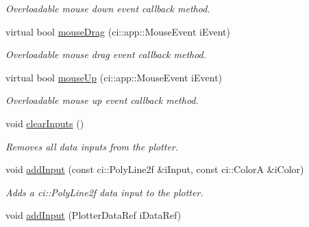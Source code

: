 \begin{DoxyCompactItemize}
\begin{DoxyCompactList}\small\item\em Overloadable mouse down event callback method. \end{DoxyCompactList}\item 
\hypertarget{class_gui_plot_a20d1f7a342435f84ece58f982b93ab73}{virtual bool \hyperlink{class_gui_plot_a20d1f7a342435f84ece58f982b93ab73}{mouse\-Drag} (ci\-::app\-::\-Mouse\-Event i\-Event)}\label{class_gui_plot_a20d1f7a342435f84ece58f982b93ab73}

\begin{DoxyCompactList}\small\item\em Overloadable mouse drag event callback method. \end{DoxyCompactList}\item 
\hypertarget{class_gui_plot_a8f6863d909939793411aa4851bd352b2}{virtual bool \hyperlink{class_gui_plot_a8f6863d909939793411aa4851bd352b2}{mouse\-Up} (ci\-::app\-::\-Mouse\-Event i\-Event)}\label{class_gui_plot_a8f6863d909939793411aa4851bd352b2}

\begin{DoxyCompactList}\small\item\em Overloadable mouse up event callback method. \end{DoxyCompactList}\item 
\hypertarget{class_gui_plot_a3df99256140c63ae43b9ba8faf0d4510}{void \hyperlink{class_gui_plot_a3df99256140c63ae43b9ba8faf0d4510}{clear\-Inputs} ()}\label{class_gui_plot_a3df99256140c63ae43b9ba8faf0d4510}

\begin{DoxyCompactList}\small\item\em Removes all data inputs from the plotter. \end{DoxyCompactList}\item 
\hypertarget{class_gui_plot_a290cf385f061efe1fedec0064f1a00ea}{void \hyperlink{class_gui_plot_a290cf385f061efe1fedec0064f1a00ea}{add\-Input} (const ci\-::\-Poly\-Line2f \&i\-Input, const ci\-::\-Color\-A \&i\-Color)}\label{class_gui_plot_a290cf385f061efe1fedec0064f1a00ea}

\begin{DoxyCompactList}\small\item\em Adds a ci\-::\-Poly\-Line2f data input to the plotter. \end{DoxyCompactList}\item 
\hypertarget{class_gui_plot_ad1ef90cad89b9ef731571f9b14df38c6}{void \hyperlink{class_gui_plot_ad1ef90cad89b9ef731571f9b14df38c6}{add\-Input} (Plotter\-Data\-Ref i\-Data\-Ref)}\label{class_gui_plot_ad1ef90cad89b9ef731571f9b14df38c6}


\end{DoxyCompactItemize}

